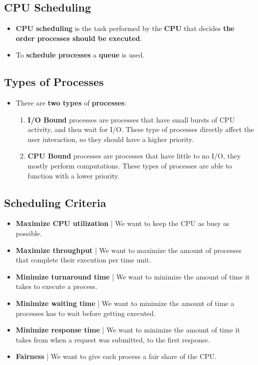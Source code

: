 \documentclass{article}
\begin{document}
\section*{}

    \subsection*{CPU Scheduling}
    \begin{itemize}
        \item \textbf{CPU scheduling} is the task performed by the \textbf{CPU} that decides \textbf{the order processes should be executed}.
        \item To \textbf{schedule processes} a \textbf{queue} is used.
    \end{itemize}

    \subsection*{Types of Processes}
    \begin{itemize}
        \item There are \textbf{two types} of \textbf{processes}:
        \begin{enumerate}
            \item \textbf{I/O Bound} processes are processes that have small bursts of CPU activity, and then wait for I/O. These type of processes directly affect the user interaction, so they should have a higher priority.
            \item \textbf{CPU Bound} processes are processes that have little to no I/O, they mostly perform computations. These types of processes are able to function with a lower priority.
        \end{enumerate}
    \end{itemize}

    \subsection*{Scheduling Criteria}
    \begin{itemize}
        \item \textbf{Maximize CPU utilization} | We want to keep the CPU as busy as possible.
        \item \textbf{Maximize throughput} | We want to maximize the amount of processes that complete their execution per time unit.
        \item \textbf{Minimize turnaround time} | We want to minimize the amount of time it takes to execute a process.
        \item \textbf{Minimize waiting time} | We want to minimize the amount of time a processes has to wait before getting executed.
        \item \textbf{Minimize response time} | We want to minimize the amount of time it takes from when a request was submitted, to the first response.
        \item \textbf{Fairness} | We want to give each process a fair share of the CPU.
    \end{itemize}
\end{document}
